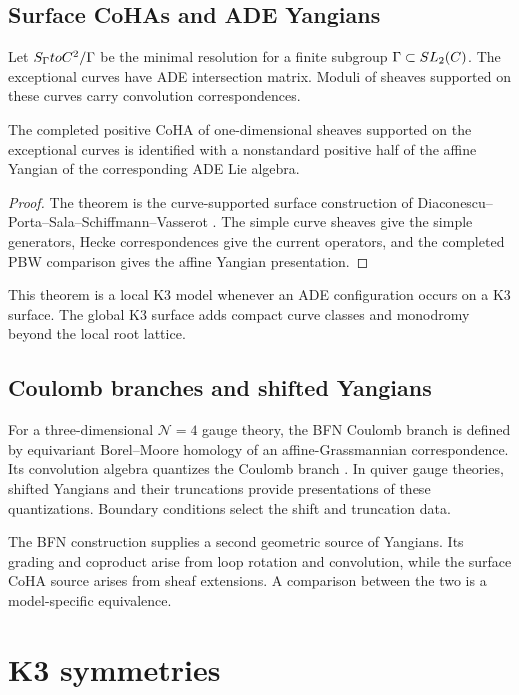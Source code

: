 \chapter{Surface CoHAs and ADE Yangians}
Let $S_\Gamma toC^2/\Gamma$ be the minimal resolution for a finite subgroup $\Gamma\subset SL_2(C)$. The exceptional curves have ADE intersection matrix. Moduli of sheaves supported on these curves carry convolution correspondences.

\begin{theorem}
The completed positive CoHA of one-dimensional sheaves supported on the exceptional curves is identified with a nonstandard positive half of the affine Yangian of the corresponding ADE Lie algebra.
\end{theorem}
\begin{proof}
The theorem is the curve-supported surface construction of Diaconescu--Porta--Sala--Schiffmann--Vasserot \cite{DPPSSV}. The simple curve sheaves give the simple generators, Hecke correspondences give the current operators, and the completed PBW comparison gives the affine Yangian presentation.
\end{proof}

This theorem is a local K3 model whenever an ADE configuration occurs on a K3 surface. The global K3 surface adds compact curve classes and monodromy beyond the local root lattice.

\chapter{Coulomb branches and shifted Yangians}
For a three-dimensional $\mathcal N=4$ gauge theory, the BFN Coulomb branch is defined by equivariant Borel--Moore homology of an affine-Grassmannian correspondence. Its convolution algebra quantizes the Coulomb branch \cite{BFN}. In quiver gauge theories, shifted Yangians and their truncations provide presentations of these quantizations. Boundary conditions select the shift and truncation data.

The BFN construction supplies a second geometric source of Yangians. Its grading and coproduct arise from loop rotation and convolution, while the surface CoHA source arises from sheaf extensions. A comparison between the two is a model-specific equivalence.

\part{K3 symmetries}

